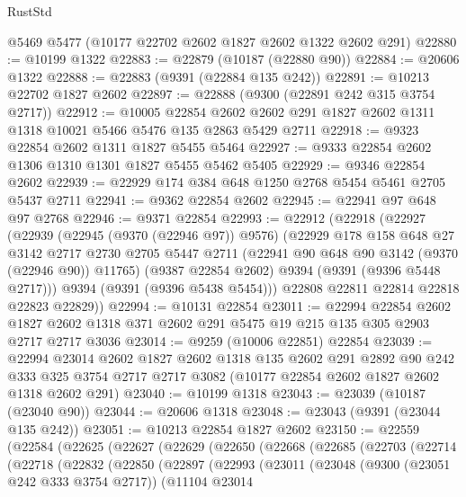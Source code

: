 \begin{lexlean}{RustStd}
\begin{coremodule}
    @5469
    @5477
    (@10177 @22702 @2602 @1827 @2602 @1322 @2602 @291)
@22880 := @10199 @1322
@22883 := @22879 (@10187 (@22880 @90))
@22884 := @20606 @1322
@22888 := @22883 (@9391 (@22884 @135 @242))
@22891 := @10213 @22702 @1827 @2602
@22897 := @22888 (@9300 (@22891 @242 @315 @3754 @2717))
@22912 := @10005
    @22854
    @2602
    @2602
    @291
    @1827
    @2602
    @1311
    @1318
    @10021
    @5466
    @5476
    @135
    @2863
    @5429
    @2711
@22918 := @9323 @22854 @2602 @1311 @1827 @5455 @5464
@22927 := @9333 @22854 @2602 @1306 @1310 @1301 @1827 @5455 @5462 @5405
@22929 := @9346 @22854 @2602
@22939 := @22929 @174 @384 @648 @1250 @2768 @5454 @5461 @2705 @5437 @2711
@22941 := @9362 @22854 @2602
@22945 := @22941 @97 @648 @97 @2768
@22946 := @9371 @22854
@22993 := @22912
    (@22918
      (@22927
        (@22939
          (@22945 (@9370 (@22946 @97)) @9576)
          (@22929
            @178
            @158
            @648
            @27
            @3142
            @2717
            @2730
            @2705
            @5447
            @2711
            (@22941 @90 @648 @90 @3142 (@9370 (@22946 @90)) @11765)
            (@9387 @22854 @2602)
            @9394
            (@9391 (@9396 @5448 @2717)))
          @9394
          (@9391 (@9396 @5438 @5454)))
        @22808
        @22811
        @22814
        @22818
        @22823
        @22829))
@22994 := @10131 @22854
@23011 := @22994
    @22854
    @2602
    @1827
    @2602
    @1318
    @371
    @2602
    @291
    @5475
    @19
    @215
    @135
    @305
    @2903
    @2717
    @2717
    @3036
@23014 := @9259 (@10006 @22851) @22854
@23039 := @22994
    @23014
    @2602
    @1827
    @2602
    @1318
    @135
    @2602
    @291
    @2892
    @90
    @242
    @333
    @325
    @3754
    @2717
    @2717
    @3082
    (@10177 @22854 @2602 @1827 @2602 @1318 @2602 @291)
@23040 := @10199 @1318
@23043 := @23039 (@10187 (@23040 @90))
@23044 := @20606 @1318
@23048 := @23043 (@9391 (@23044 @135 @242))
@23051 := @10213 @22854 @1827 @2602
@23150 := @22559
    (@22584
      (@22625
        (@22627
          (@22629
            (@22650
              (@22668
                (@22685
                  (@22703
                    (@22714
                      (@22718
                        (@22832
                          (@22850
                            (@22897
                              (@22993
                                (@23011
                                  (@23048
                                    (@9300 (@23051 @242 @333 @3754 @2717))
                                    (@11104
                                      @23014

\end{coremodule}
\end{lexlean}
